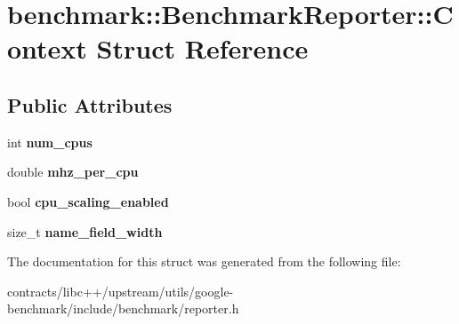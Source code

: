 \hypertarget{structbenchmark_1_1_benchmark_reporter_1_1_context}{}\section{benchmark\+:\+:Benchmark\+Reporter\+:\+:Context Struct Reference}
\label{structbenchmark_1_1_benchmark_reporter_1_1_context}
\subsection*{Public Attributes}
\begin{DoxyCompactItemize}
\item 
\mbox{\label{structbenchmark_1_1_benchmark_reporter_1_1_context_ae0dad87024540b599cfce0f50ac46c49}} 
int {\bfseries num\+\_\+cpus}
\item 
\mbox{\label{structbenchmark_1_1_benchmark_reporter_1_1_context_afe4321873be180cf16e4ddef22a5cee2}} 
double {\bfseries mhz\+\_\+per\+\_\+cpu}
\item 
\mbox{\label{structbenchmark_1_1_benchmark_reporter_1_1_context_a3bf3608fca365e75a3bf7a035fe79528}} 
bool {\bfseries cpu\+\_\+scaling\+\_\+enabled}
\item 
\mbox{\label{structbenchmark_1_1_benchmark_reporter_1_1_context_aa966962cff3dcaf275ea55bb370c507f}} 
size\+\_\+t {\bfseries name\+\_\+field\+\_\+width}
\end{DoxyCompactItemize}


The documentation for this struct was generated from the following file\+:\begin{DoxyCompactItemize}
\item 
contracts/libc++/upstream/utils/google-\/benchmark/include/benchmark/reporter.\+h\end{DoxyCompactItemize}
